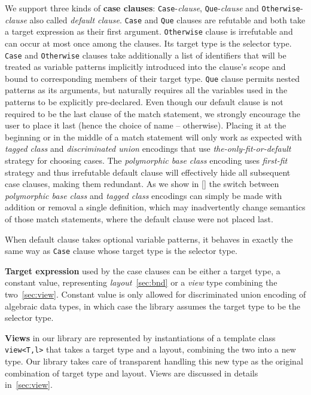 \documentclass[preprint]{sigplanconf}
\makeatletter
\DeclareRobustCommand{\code}[1]{{\lstinline[breaklines=false,escapechar=@]{#1}}}
\makeatother
\begin{document}
We support three kinds of {\bf case clauses}: \code{Case}-\emph{clause}, 
\code{Que}-\emph{clause} and \code{Otherwise}-\emph{clause} also called 
\emph{default clause}. \code{Case} and \code{Que} clauses are refutable and both 
take a target expression as their first argument. \code{Otherwise} clause is 
irrefutable and can occur at most once among the clauses. Its target type is 
the selector type. \code{Case} and \code{Otherwise} clauses take additionally a 
list of identifiers that will be treated as variable patterns implicitly 
introduced into the clause's scope and bound to corresponding members of their 
target type. \code{Que} clause permits nested patterns as its arguments, but 
naturally requires all the variables used in the patterns to be explicitly 
pre-declared. Even though our default clause is not required to be the last 
clause of the match statement, we strongly encourage the user to place it 
last (hence the choice of name -- otherwise). Placing it at the beginning or in 
the middle of a match statement will only work as expected with \emph{tagged 
class} and \emph{discriminated union} encodings that use 
\emph{the-only-fit-or-default} strategy for choosing cases. The 
\emph{polymorphic base class} encoding uses \emph{first-fit} strategy and thus 
irrefutable default clause will effectively hide all subsequent case 
clauses, making them redundant. As we show in \textsection\ref{} the switch 
between \emph{polymorphic base class} and \emph{tagged class} encodings can 
simply be made with addition or removal a single definition, which may 
inadvertently change semantics of those match statements, where the default 
clause were not placed last.

When default clause takes optional variable patterns, it behaves in 
exactly the same way as \code{Case} clause whose target type is the selector 
type.

{\bf Target expression} used by the case clauses can be either a target type, 
a constant value, representing \emph{layout}~\textsection\ref{sec:bnd} or a 
\emph{view} type combining the two~\textsection\ref{sec:view}. Constant value 
is only allowed for discriminated union encoding of algebraic data types, in 
which case the library assumes the target type to be the selector type.

{\bf Views} in our library are represented by instantiations of a template class 
\code{view<T,l>} that takes a target type and a layout, combining the two into a 
new type. Our library takes care of transparent handling this new type as the 
original combination of target type and layout. Views are discussed in details 
in~\textsection\ref{sec:view}.
\end{document}
